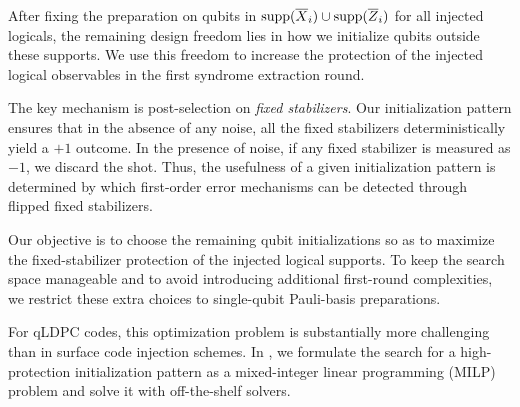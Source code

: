 After fixing the preparation on qubits in
$\mathrm{supp}(\overline{X}_i)\cup \mathrm{supp}(\overline{Z}_i)$ for all injected logicals,
the remaining design freedom lies in how we initialize qubits outside these supports.
We use this freedom to increase the protection of the injected logical observables in the first syndrome extraction round.

The key mechanism is post-selection on \emph{fixed stabilizers}.
Our initialization pattern ensures that in the absence of any noise, all the fixed stabilizers deterministically yield a $+1$ outcome.
In the presence of noise, if any fixed stabilizer is measured as $-1$, we discard the shot.
Thus, the usefulness of a given initialization pattern is determined by which first-order error mechanisms can be detected through flipped fixed stabilizers.

Our objective is to choose the remaining qubit initializations so as to maximize the fixed-stabilizer protection of the injected logical supports.
To keep the search space manageable and to avoid introducing additional first-round complexities, we restrict these extra choices to single-qubit Pauli-basis preparations.

For qLDPC codes, this optimization problem is substantially more challenging than in surface code injection schemes.
In , we formulate the search for a high-protection initialization pattern as a mixed-integer linear programming (MILP) problem and solve it with off-the-shelf solvers.
